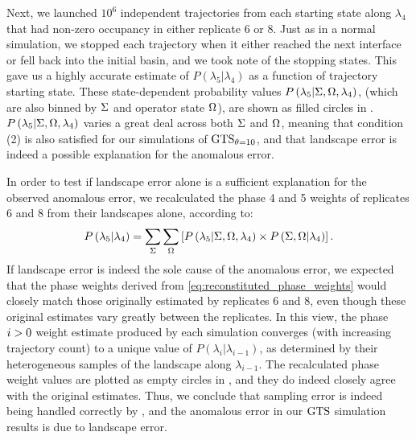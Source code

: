 Next, we launched $10^6$ independent trajectories from each starting state along $\lambda_4$ that had non-zero occupancy in either replicate 6 or 8. Just as in a normal  simulation, we stopped each trajectory when it either reached the next interface or fell back into the initial basin, and we took note of the stopping states. This gave us a highly accurate estimate of $P\left(\lambda_{5} | \lambda_{4}\right)$ as a function of trajectory starting state. These state-dependent probability values $P\left(\lambda_{5} | \Sigma, \Omega, \lambda_4\right)$, (which are also binned by $\Sigma$ and operator state $\Omega$), are shown as filled circles in . $P\left(\lambda_{5} | \Sigma, \Omega, \lambda_4\right)$ varies a great deal across both $\Sigma$ and  $\Omega$, meaning that condition (2) is also satisfied for our simulations of $\text{GTS}_{\theta=10}$, and that landscape error is indeed a possible explanation for the anomalous error.
 
In order to test if landscape error alone is a sufficient explanation for the observed anomalous error, we recalculated the phase 4 and 5 weights of replicates 6 and 8 from their landscapes alone, according to:
\begin{equation}
\label{eq:reconstituted_phase_weights}
	P\left(\lambda_{5} | \lambda_{4}\right) = \sum\limits_{\Sigma} \sum\limits_{\Omega} \left[ P\left(\lambda_{5}|\Sigma, \Omega, \lambda_{4}\right) \times P\left(\Sigma, \Omega|\lambda_{4}\right) \right].
\end{equation}
If landscape error is indeed the sole cause of the anomalous error, we expected that the phase weights derived from \eqref{eq:reconstituted_phase_weights} would closely match those originally estimated by replicates 6 and 8, even though these original estimates vary greatly between the replicates. In this view, the phase $i>0$ weight estimate produced by each simulation converges (with increasing trajectory count) to a unique value of $P\left(\lambda_{i}|\lambda_{i-1}\right)$, as determined by their heterogeneous samples of the landscape along $\lambda_{i-1}$. The recalculated phase weight values are plotted as empty circles in , and they do indeed closely agree with the original estimates. Thus, we conclude that sampling error is indeed being handled correctly by , and the anomalous error in our $\text{GTS}$ simulation results is due to landscape error.

